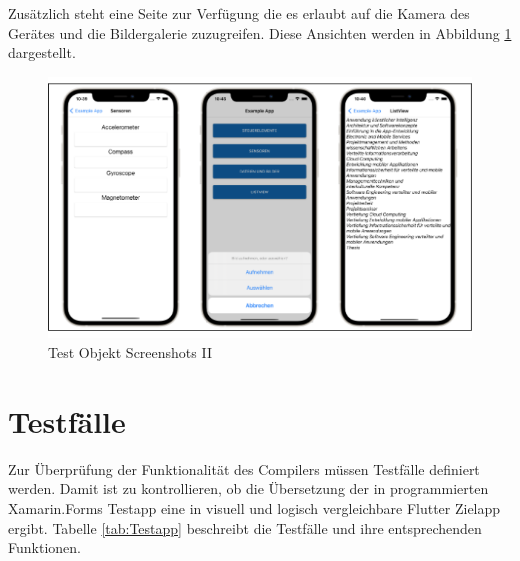  Zusätzlich steht eine Seite zur Verfügung die es erlaubt auf die Kamera des Gerätes und die Bildergalerie zuzugreifen.  Diese Ansichten werden in Abbildung \ref{fig:TestObjectII} dargestellt.


\begin{figure}[!ht]
 \includegraphics[width=\textwidth,keepaspectratio]{Images/Screenshot/Sensors.png}
 \caption{Test Objekt Screenshots II}
 \label{fig:TestObjectII}
\end{figure}

\section{Testfälle}
Zur Überprüfung der Funktionalität des Compilers müssen Testfälle definiert werden. Damit ist zu 
kontrollieren, ob die Übersetzung der in \Csharp{} programmierten  Xamarin.Forms Testapp eine in 
visuell und logisch vergleichbare Flutter Zielapp ergibt.  Tabelle \ref{tab:Testapp} beschreibt die Testfälle und ihre entsprechenden Funktionen.


